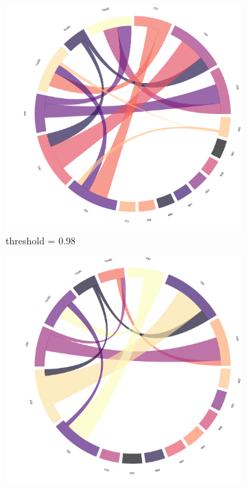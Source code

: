 \begin{figure}[!h]
	\begin{subfigure}[b]{0.3\linewidth}
		\includegraphics[width=\linewidth]{figures/chords/chord_swap_ensemble1000_RCN5333300_098.png}
		\caption{threshold = 0.98}
	\end{subfigure}
	\hfill
	\begin{subfigure}[b]{0.3\linewidth}
		\includegraphics[width=\linewidth]{figures/chords/chord_swap_ensemble1000_RCN5333300_099.png}

\end{subfigure}
\end{figure}
